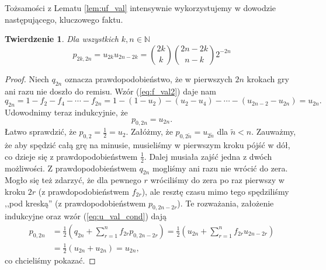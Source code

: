 \documentclass[a4paper,11pt,twoside]{book}
\newtheorem{twier}{Twierdzenie}[chapter]
\theoremstyle{definition}
\begin{document}
Tożsamości z Lematu \ref{lem:uf_val} intensywnie wykorzystujemy w dowodzie następującego, kluczowego faktu.
\begin{twier}
 \label{twier:disc_asine_law}
 Dla wszystkich $k, n \in \mathbb{N}$
 \begin{equation}
  p_{2k,2n} = u_{2k} u_{2n-2k} = \binom{2k}{k}\binom{2n-2k}{n-k}2^{-2n} \label{eq:disc_asine_law}
 \end{equation}
\end{twier}
\begin{proof}
Niech $q_{2n}$ oznacza prawdopodobieństwo, że w pierwszych $2n$ krokach gry ani razu nie doszło do remisu. Wzór (\ref{eq:f_val2}) daje nam
\[ q_{2n} = 1 - f_2 - f_4 - \cdots - f_{2n} = 1 - (1- u_2) - (u_2 - u_4) - \cdots - (u_{2n-2} - u_{2n}) = u_{2n}. \]
Udowodnimy teraz indukcyjnie, że
\begin{equation}
 p_{0,2n} = u_{2n}. \label{eq:disc_asine_law_k0}
\end{equation}
Łatwo sprawdzić, że $p_{0,2} = \frac{1}{2} = u_2$. Załóżmy, że $p_{0,2\tilde{n}} = u_{2\tilde{n}}$ dla $\tilde{n} < n$.  Zauważmy, że aby spędzić całą grę na minusie, musieliśmy w pierwszym kroku pójść w dół, co dzieje się z prawdopodobieństwem $\frac{1}{2}$. Dalej musiała zajść jedna z dwóch możliwości. Z prawdopodobieństwem $q_{2n}$ mogliśmy ani razu nie wrócić do zera. Mogło się też zdarzyć, że dla pewnego $r$ wróciliśmy do zera po raz pierwszy w kroku $2r$ (z prawdopodobieństwem $f_{2r}$), ale resztę czasu mimo tego spędziliśmy ,,pod kreską'' (z prawdopodobieństwem $p_{0,2n-2r}$). Te rozważania, założenie indukcyjne oraz wzór (\ref{eq:u_val_cond}) dają
\begin{equation*}
 \begin{split}
  p_{0,2n} &= \frac{1}{2} \left( q_{2n} + \sum_{r=1}^n f_{2r} p_{0,2n-2r} \right) = \frac{1}{2} \left( u_{2n} + \sum_{r=1}^n f_{2r} u_{2n-2r}  \right) \\
  &= \frac{1}{2} \left( u_{2n} + u_{2n}  \right) = u_{2n},
 \end{split}
\end{equation*}
co chcieliśmy pokazać.


\end{proof}
\end{document}
